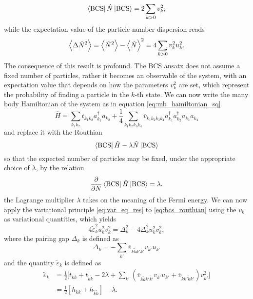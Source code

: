 \begin{equation}
    \bra{\text{BCS}} \hat N \ket{\text{BCS}} = 2\sum_ {k>0} v_k^2,
\end{equation}
while the expectation value of the particle number dispersion reads
\begin{equation}
\expval{\Delta\hat N ^2} = \expval{\hat N^2} - \expval{\hat N}^2 = 4\sum_{k>0} v_k^2 u_k^2.
\end{equation}
The consequence of this result is profound. The BCS ansatz does not assume a fixed number of particles, rather it becomes an observable of the system, with an expectation value that depends on how the parameters $v_k^2$ are set, which represent the probability of finding a particle in the $k$-th state.
We can now write the many body Hamiltonian of the system as in equation \eqref{eq:mb_hamiltonian_sq}
\begin{equation}
    \hat H = \sum_{k_1 k_2}t_{k_1k_2} a_{k_1}^\dagger a_{k_2} + \frac 1 4 \sum_{k_1 k_2 k_3 k_4}\overline{v}_{k_1k_2k_3k_4} a_{k_1}^\dagger a_{k_2}^\dagger a_{k_3} a_{k_4}
\end{equation}
and replace it with the Routhian 
\begin{equation}
    \label{eq:bcs_routhian}
    \bra{\text{BCS}} \hat H - \lambda \hat N \ket{\text{BCS}}
\end{equation}
so that the expected number of particles may be fixed, under the appropriate choice of $\lambda$, by the relation
\begin{equation}
\pdv{}{N}\bra{\text{BCS}} \hat H  \ket{\text{BCS}} = \lambda.
\end{equation}
the Lagrange multiplier $\lambda$ takes on the meaning of the Fermi energy.
We can now apply the variational principle \eqref{eq:var_eq_res} to \eqref{eq:bcs_routhian} using the $v_k$ as variational quantities, which yields 
\begin{equation}
   4\tilde \varepsilon_k ^2 u_k^2 v_k^2 = \Delta_k ^2 - 4\Delta_k^2 u_k^2v_k^2,
\end{equation}
where the pairing gap $\Delta_k$ is defined as
\begin{equation}
    \label{eq:delta_k}
    \Delta_k = - \sum_{k'}\overline v_{k\tilde k k'\tilde{k'}}v_{k'}u_{k'} 
    \end{equation}
and the quantity $\tilde\varepsilon_k$ is defined as 
\begin{align}
    \label{eq:epsilon}
    \tilde \varepsilon_k &= \frac 1 2 \bigg[t_{kk} + t_{\tilde k \tilde k }-2\lambda +\sum_{k'}(\overline v_{k\tilde k k'\tilde{k'}}v_{k'}u_{k'} + \overline v_{\tilde k k' \tilde k k'})v_{k'}^2\bigg]
    \\&=\frac 1 2 [h_{kk}+h_{\tilde k \tilde k}]-\lambda.
\end{align}
